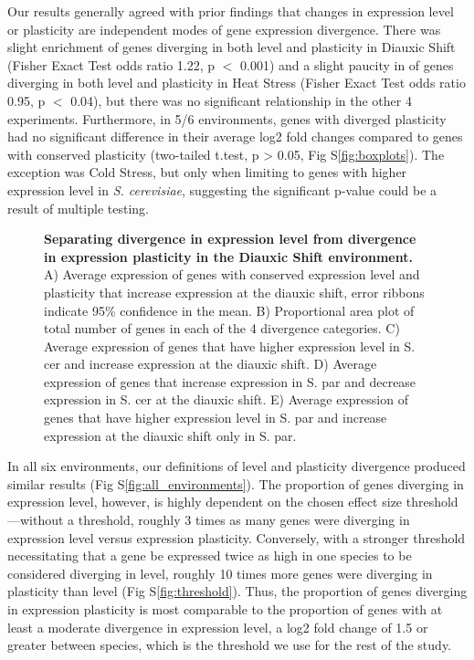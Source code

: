 Our results generally agreed with prior findings that changes in expression level or plasticity are independent modes of gene expression divergence. There was slight enrichment of genes diverging in both level and plasticity in Diauxic Shift (Fisher Exact Test odds ratio 1.22, p $<$ 0.001) and a slight paucity in of genes diverging in both level and plasticity in Heat Stress (Fisher Exact Test odds ratio 0.95, p $<$ 0.04), but there was no significant relationship in the other 4 experiments. Furthermore, in 5/6 environments, genes with diverged plasticity had no significant difference in their average log2 fold changes compared to genes with conserved plasticity (two-tailed t.test, p > 0.05, Fig S\ref{fig:boxplots}). The exception was Cold Stress, but only when limiting to genes with higher expression level in \textit{S. cerevisiae}, suggesting the significant p-value could be a result of multiple testing.

\begin{figure}
    \centering
    \caption{\textbf{Separating divergence in expression level from divergence in expression plasticity in the Diauxic Shift environment.} A) Average expression of genes with conserved expression level and plasticity that increase expression at the diauxic shift, error ribbons indicate 95\% confidence in the mean. B) Proportional area plot of total number of genes in each of the 4 divergence categories. C) Average expression of genes that have higher expression level in S. cer and increase expression at the diauxic shift. D) Average expression of genes that increase expression in S. par and decrease expression in S. cer at the diauxic shift. E) Average expression of genes that have higher expression level in S. par and increase expression at the diauxic shift only in S. par.}
    \label{fig:diauxic}
\end{figure}

In all six environments, our definitions of level and plasticity divergence produced similar results (Fig S\ref{fig:all_environments}). The proportion of genes diverging in expression level, however, is highly dependent on the chosen effect size threshold—without a threshold, roughly 3 times as many genes were diverging in expression level versus expression plasticity. Conversely, with a stronger threshold necessitating that a gene be expressed twice as high in one species to be considered diverging in level, roughly 10 times more genes were diverging in plasticity than level (Fig S\ref{fig:threshold}). Thus, the proportion of genes diverging in expression plasticity is most comparable to the proportion of genes with at least a moderate divergence in expression level, a log2 fold change of 1.5 or greater between species, which is the threshold we use for the rest of the study.

